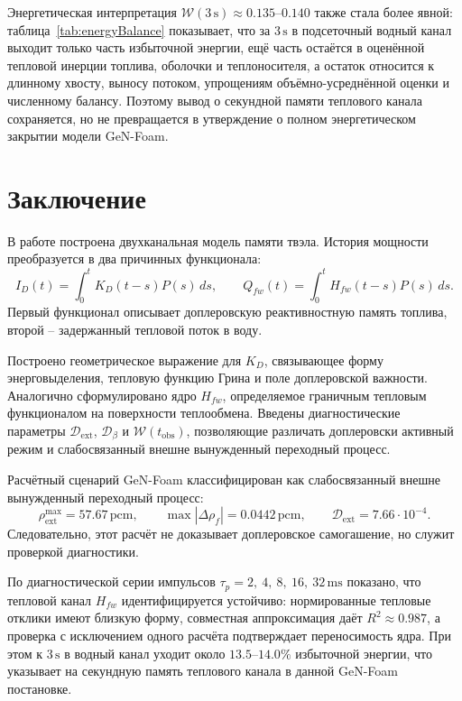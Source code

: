 \documentclass[12pt]{article}
\begin{document}
Энергетическая интерпретация \(\mathcal W(3\,\mathrm{s})\approx0.135\)--\(0.140\) также стала более явной: таблица~\ref{tab:energyBalance} показывает, что за \(3\,\mathrm{s}\) в подсеточный водный канал выходит только часть избыточной энергии, ещё часть остаётся в оценённой тепловой инерции топлива, оболочки и теплоносителя, а остаток относится к длинному хвосту, выносу потоком, упрощениям объёмно-усреднённой оценки и численному балансу. Поэтому вывод о секундной памяти теплового канала сохраняется, но не превращается в утверждение о полном энергетическом закрытии модели GeN-Foam.

\section{Заключение}

В работе построена двухканальная модель памяти твэла. История мощности преобразуется в два причинных функционала:
\[
I_D(t)=\int_0^tK_D(t-s)P(s)\,ds,
\qquad
Q_{fw}(t)=\int_0^tH_{fw}(t-s)P(s)\,ds.
\]
Первый функционал описывает доплеровскую реактивностную память топлива, второй -- задержанный тепловой поток в воду.

Построено геометрическое выражение для \(K_D\), связывающее форму энерговыделения, тепловую функцию Грина и поле доплеровской важности. Аналогично сформулировано ядро \(H_{fw}\), определяемое граничным тепловым функционалом на поверхности теплообмена. Введены диагностические параметры \(\mathcal D_{\mathrm{ext}}\), \(\mathcal D_\beta\) и \(\mathcal W(t_{\mathrm{obs}})\), позволяющие различать доплеровски активный режим и слабосвязанный внешне вынужденный переходный процесс.

Расчётный сценарий GeN-Foam классифицирован как слабосвязанный внешне вынужденный переходный процесс:
\[
\rho_{\mathrm{ext}}^{\max}=57.67\,\mathrm{pcm},
\qquad
\max|\Delta\rho_f|=0.0442\,\mathrm{pcm},
\qquad
\mathcal D_{\mathrm{ext}}=7.66\cdot10^{-4}.
\]
Следовательно, этот расчёт не доказывает доплеровское самогашение, но служит проверкой диагностики.

По диагностической серии импульсов \(\tau_p=2,\ 4,\ 8,\ 16,\ 32\,\mathrm{ms}\) показано, что тепловой канал \(H_{fw}\) идентифицируется устойчиво: нормированные тепловые отклики имеют близкую форму, совместная аппроксимация даёт \(R^2\approx0.987\), а проверка с исключением одного расчёта подтверждает переносимость ядра. При этом к \(3\,\mathrm{s}\) в водный канал уходит около \(13.5\)--\(14.0\%\) избыточной энергии, что указывает на секундную память теплового канала в данной GeN-Foam постановке.
\end{document}
